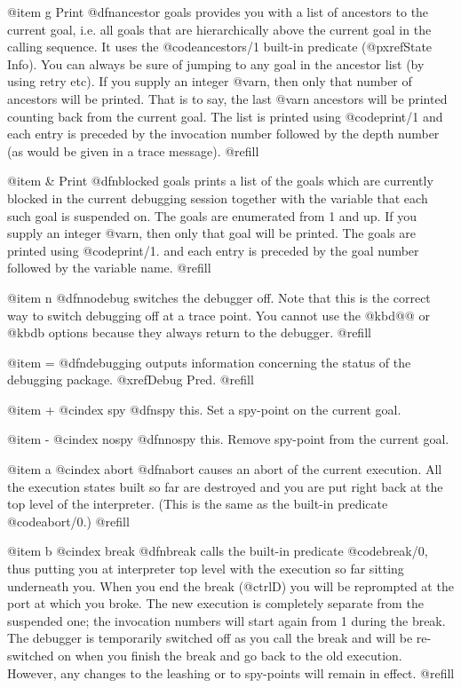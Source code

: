 @item g
Print @dfn{ancestor} goals provides you with a list of ancestors to the
current goal, i.e. all goals that are hierarchically above the current
goal in the calling sequence.  It uses the @code{ancestors/1} built-in
predicate (@pxref{State Info}).  You can always be sure of jumping to any
goal in the ancestor list (by using retry etc).  If you supply an integer
@var{n}, then only that number of ancestors will be printed.  That is to
say, the last @var{n} ancestors will be printed counting back from the
current goal.  The list is printed using @code{print/1} and each entry is
preceded by the invocation number followed by the depth number (as would be
given in a trace message). @refill

@item &
Print @dfn{blocked} goals prints a list of the goals which are currently
blocked in the current debugging session together with the variable that
each such goal is suspended on.  The goals are enumerated from 1 and up.
If you supply an integer @var{n}, then only that goal will be printed.
The goals are printed using @code{print/1}. and each entry is preceded
by the goal number followed by the variable name. @refill

@item n
@dfn{nodebug} switches the debugger off.  Note that this is the correct way
to switch debugging off at a trace point.  You cannot use the @kbd{@@} or
@kbd{b} options because they always return to the debugger. @refill

@item =
@dfn{debugging} outputs information concerning the status of the debugging
package. @xref{Debug Pred}. @refill

@item +
@cindex spy
@dfn{spy this}.  Set a spy-point on the current goal.

@item -
@cindex nospy
@dfn{nospy this}.  Remove spy-point from the current goal.

@item a
@cindex abort
@dfn{abort} causes an abort of the current execution.  All the execution
states built so far are destroyed and you are put right back at the top
level of the interpreter.  (This is the same as the built-in predicate
@code{abort/0}.) @refill

@item b
@cindex break
@dfn{break} calls the built-in predicate @code{break/0}, thus putting you
at interpreter top level with the execution so far sitting underneath you.
When you end the break (@ctrl{D}) you will be reprompted at the port at
which you broke.  The new execution is completely separate from the
suspended one; the invocation numbers will start again from 1 during the
break.  The debugger is temporarily switched off as you call the break and
will be re-switched on when you finish the break and go back to the old
execution.  However, any changes to the leashing or to spy-points will
remain in effect. @refill

